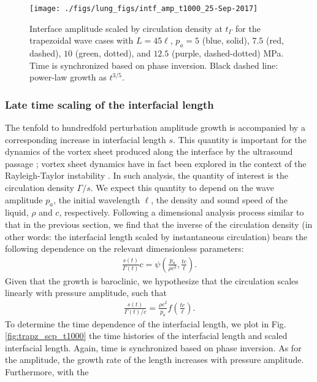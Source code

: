 \documentclass{jfm}%
\begin{document}
%
\begin{figure}
  \centering
 \texttt{[image: ./figs/lung\_figs/intf\_amp\_t1000\_25-Sep-2017]}
  \caption{Interface amplitude scaled by circulation density at
    $t_\Gamma$ for the trapezoidal wave cases with $L=45\ell$, $p_a =
    5$ (blue, solid), $7.5$ (red, dashed), $10$ (green, dotted), and $12.5$ (purple, dashed-dotted)
    MPa. Time is synchronized based on phase inversion. Black dashed
    line: power-law growth as $t^{3/5}$.}
  \label{fig:trapz_interface_t1000_scaled}
\end{figure}
%

\subsubsection{Late time scaling of the interfacial length}
The tenfold to hundredfold perturbation amplitude growth is
accompanied by a corresponding increase in interfacial length
$s$. This quantity is important for the dynamics of the vortex sheet
produced along the interface by the ultrasound passage
\citep{Pozrikidis2000}; vortex sheet dynamics have in fact been
explored in the context of the Rayleigh-Taylor instability
\citep{Tryggvason1988}. In such analysis, the quantity of interest is
the circulation density $\Gamma / s$.  We expect this quantity to depend on the wave amplitude
$p_a$, the initial wavelength $\ell$, the density and sound speed of
the liquid, $\rho$ and $c$, respectively. Following a dimensional
analysis process similar to that in the previous section, we find that
the inverse of the circulation density (in other words: the
interfacial length scaled by instantaneous circulation) bears the
following dependence on the relevant dimensionless parameters:%
%
\begin{align}
  \frac{s(t)}{\Gamma(t)}c = \psi\left(\frac{p_a}{\rho c^2},\frac{tc}{\ell}\right).%
\end{align}
%
Given that the growth is baroclinic, we hypothesize that the
circulation scales linearly with pressure amplitude, such that%
%
\begin{align}
  \frac{s(t)}{\Gamma(t)/c} = \frac{\rho c^2}{p_a}f\left(\frac{tc}{\ell}\right).%
\end{align}%
To determine the time dependence of the interfacial length, we plot in
Fig. \ref{fig:trapz_scp_t1000} the time histories of the interfacial
length and scaled interfacial length. Again, time is synchronized
based on phase inversion. As for the amplitude, the growth rate of the
length increases with pressure amplitude. Furthermore, with the
\end{document}
